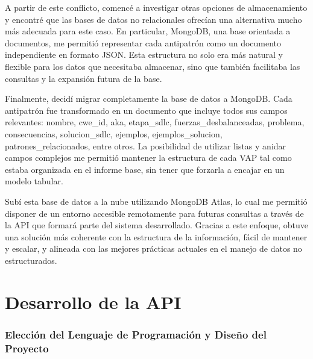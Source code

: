 A partir de este conflicto, comencé a investigar otras opciones de almacenamiento y encontré que las bases de datos no relacionales ofrecían una alternativa mucho más adecuada para este caso. En particular, MongoDB, una base orientada a documentos, me permitió representar cada antipatrón como un documento independiente en formato JSON. Esta estructura no solo era más natural y flexible para los datos que necesitaba almacenar, sino que también facilitaba las consultas y la expansión futura de la base.

Finalmente, decidí migrar completamente la base de datos a MongoDB. Cada antipatrón fue transformado en un documento que incluye todos sus campos relevantes: nombre, cwe\_id, aka, etapa\_sdlc, fuerzas\_desbalanceadas, problema, consecuencias, solucion\_sdlc, ejemplos, ejemplos\_solucion, patrones\_relacionados, entre otros. La posibilidad de utilizar listas y anidar campos complejos me permitió mantener la estructura de cada VAP tal como estaba organizada en el informe base, sin tener que forzarla a encajar en un modelo tabular.

Subí esta base de datos a la nube utilizando MongoDB Atlas, lo cual me permitió disponer de un entorno accesible remotamente para futuras consultas a través de la API que formará parte del sistema desarrollado. Gracias a este enfoque, obtuve una solución más coherente con la estructura de la información, fácil de mantener y escalar, y alineada con las mejores prácticas actuales en el manejo de datos no estructurados.


\section{Desarrollo de la API}

\subsubsection{Elección del Lenguaje de Programación y Diseño del Proyecto}


